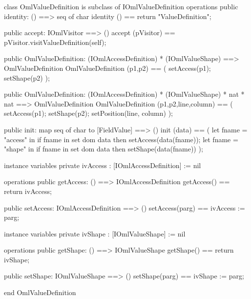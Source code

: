 \begin{vdm_al}
class OmlValueDefinition is subclass of IOmlValueDefinition
operations
  public identity: () ==> seq of char
  identity () == return "ValueDefinition";

  public accept: IOmlVisitor ==> ()
  accept (pVisitor) == pVisitor.visitValueDefinition(self);

  public OmlValueDefinition:
    (IOmlAccessDefinition) *
    (IOmlValueShape) ==> OmlValueDefinition
  OmlValueDefinition (p1,p2) == 
    ( setAccess(p1);
      setShape(p2) );

  public OmlValueDefinition:
    (IOmlAccessDefinition) *
    (IOmlValueShape) *
    nat *
    nat ==> OmlValueDefinition
  OmlValueDefinition (p1,p2,line,column) == 
    ( setAccess(p1);
      setShape(p2);
      setPosition(line, column) );

  public init: map seq of char to [FieldValue] ==> ()
  init (data) ==
    ( let fname = "access" in
        if fname in set dom data
        then setAccess(data(fname));
      let fname = "shape" in
        if fname in set dom data
        then setShape(data(fname)) );

instance variables
  private ivAccess : [IOmlAccessDefinition] := nil

operations
  public getAccess: () ==> IOmlAccessDefinition
  getAccess() == return ivAccess;

  public setAccess: IOmlAccessDefinition ==> ()
  setAccess(parg) == ivAccess := parg;

instance variables
  private ivShape : [IOmlValueShape] := nil

operations
  public getShape: () ==> IOmlValueShape
  getShape() == return ivShape;

  public setShape: IOmlValueShape ==> ()
  setShape(parg) == ivShape := parg;

end OmlValueDefinition
\end{vdm_al}

